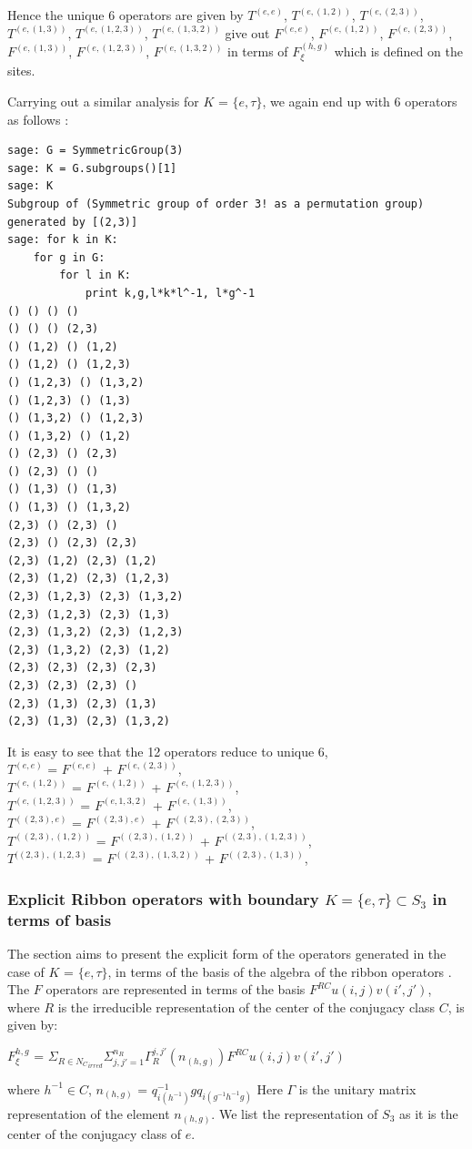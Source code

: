 Hence the unique 6 operators are given by $T^{(e,e)}$, $T^{(e,(1,2))}$, $T^{(e,(2,3))}$, $T^{(e,(1,3))}$, $T^{(e,(1,2,3))}$, $T^{(e,(1,3,2))}$ give
out $F^{(e,e)}$, $F^{(e,(1,2))}$, $F^{(e,(2,3))}$, $F^{(e,(1,3))}$, $F^{(e,(1,2,3))}$, $F^{(e,(1,3,2))}$ in terms of $F_{\xi}^{(h,g)}$ which is defined on the sites.

Carrying out a similar analysis for $K$ = $\{e, \tau\}$, we again end up with 6 operators as follows :

\begin{lstlisting}[frame=single]
sage: G = SymmetricGroup(3)
sage: K = G.subgroups()[1]
sage: K
Subgroup of (Symmetric group of order 3! as a permutation group) generated by [(2,3)]
sage: for k in K:
    for g in G:
        for l in K:
            print k,g,l*k*l^-1, l*g^-1
() () () ()
() () () (2,3)
() (1,2) () (1,2)
() (1,2) () (1,2,3)
() (1,2,3) () (1,3,2)
() (1,2,3) () (1,3)
() (1,3,2) () (1,2,3)
() (1,3,2) () (1,2)
() (2,3) () (2,3)
() (2,3) () ()
() (1,3) () (1,3)
() (1,3) () (1,3,2)
(2,3) () (2,3) ()
(2,3) () (2,3) (2,3)
(2,3) (1,2) (2,3) (1,2)
(2,3) (1,2) (2,3) (1,2,3)
(2,3) (1,2,3) (2,3) (1,3,2)
(2,3) (1,2,3) (2,3) (1,3)
(2,3) (1,3,2) (2,3) (1,2,3)
(2,3) (1,3,2) (2,3) (1,2)
(2,3) (2,3) (2,3) (2,3)
(2,3) (2,3) (2,3) ()
(2,3) (1,3) (2,3) (1,3)
(2,3) (1,3) (2,3) (1,3,2) 
\end{lstlisting}

It is easy to see that the 12 operators reduce to unique 6, \\
$T^{(e,e)}$ = $F^{(e,e)}$ + $F^{(e,(2,3))}$, \\
$T^{(e,(1,2))}$ = $F^{(e,(1,2))}$ + $F^{(e,(1,2,3))}$, \\ 
$T^{(e,(1,2,3))}$ = $F^{(e,1,3,2)}$ + $F^{(e,(1,3))}$, \\
$T^{((2,3),e)}$ = $F^{((2,3),e)}$ + $F^{((2,3),(2,3))}$,\\
$T^{((2,3),(1,2))}$ = $F^{((2,3),(1,2))}$ + $F^{((2,3),(1,2,3))}$,\\
$T^{((2,3),(1,2,3)}$ = $F^{((2,3),(1,3,2))}$ + $F^{((2,3),(1,3))}$,\\

\subsubsection{Explicit Ribbon operators with boundary $K = \{e, \tau\} \subset S_{3}$ in terms of basis}
The section aims to present the explicit form of the operators generated in the case of $K$ = $\{e, \tau\}$,
in terms of the basis of the algebra of the ribbon operators \citep{Reference2}. The $F$ operators are represented 
in terms of the basis $F^{RC}u(i,j)v(i',j')$, where $R$ is the irreducible representation of the 
center of the conjugacy class $C$, is given by:
\begin{center}
$F_{\xi}^{h,g}$ = $\Sigma_{R \in {N_{C}}_{irred}} \Sigma_{j,j'=1}^{n_{R}} \Gamma^{j,j'}_{R}(n_{(h,g)})F^{RC}u(i,j)v(i',j')$ 
\end{center}
where $h^{-1} \in C$, $n_{(h,g)}$ = $q_{i(h^{-1})}^{-1}gq_{i(g^{-1}h^{-1}g)}$  Here $\Gamma$ is the unitary matrix representation of the element $n_{(h,g)}$. We list the representation of $S_3$ as it 
is the center of the conjugacy class of $e$.


